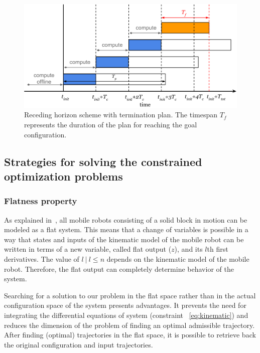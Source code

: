 \documentclass[eprint]{actapoly}
\begin{document}
\begin{figure}[!h]
  \centering
  \includegraphics[width=\linewidth]{./images/receding_horizon/recedinghorizon2.png} %
  \caption{Receding horizon scheme with termination plan. The timespan $T_f$ represents the duration of the plan for reaching the goal configuration.\label{fig:recedinghor}}
\end{figure}



\subsection{Strategies for solving the constrained optimization problems}



\subsubsection{Flatness property}

As explained in~\cite{Defoort2007a}, all mobile robots consisting of a solid
block in motion can be modeled as a flat system. 
This means that a change of variables is possible in a way that states and
inputs of the kinematic model of the mobile robot can be written in terms
of a new variable, called flat output ($z$), and its $l$th first derivatives.
The value of $l\ |\ l \leq n$ depends on the kinematic model of the mobile robot.
Therefore, the flat output can completely determine behavior of the system.


Searching for a solution to our problem in the flat space rather than in
the actual configuration space of the system presents advantages.
It prevents the need for integrating the differential equations
of system (constraint ~\ref{eq:kinematic}) and reduces the dimension of the 
problem of finding an optimal admissible trajectory.
After finding (optimal) trajectories in the flat space, it is possible
to retrieve back the original configuration and input trajectories.
\end{document}
